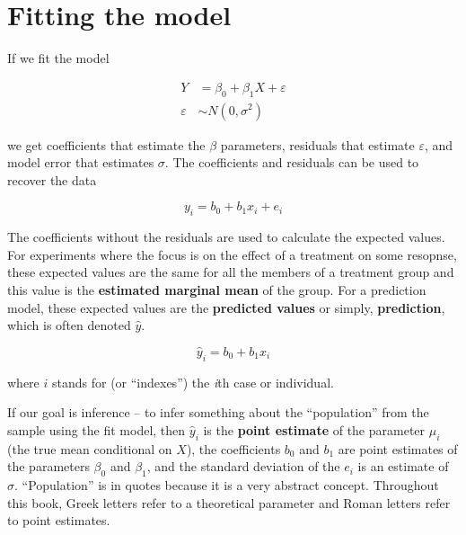 \documentclass[]{book}
\begin{document}
\hypertarget{fitting-the-model}{%
\section{Fitting the model}\label{fitting-the-model}}

If we fit the model

\begin{align}
Y &= \beta_0 + \beta_1 X + \varepsilon\\
\varepsilon &\sim N(0, \sigma^2)
\end{align}

we get coefficients that estimate the \(\beta\) parameters, residuals that estimate \(\varepsilon\), and model error that estimates \(\sigma\). The coefficients and residuals can be used to recover the data

\begin{equation}
y_i = b_0 + b_1 x_i + e_i
\end{equation}

The coefficients without the residuals are used to calculate the expected values. For experiments where the focus is on the effect of a treatment on some resopnse, these expected values are the same for all the members of a treatment group and this value is the \textbf{estimated marginal mean} of the group. For a prediction model, these expected values are the \textbf{predicted values} or simply, \textbf{prediction}, which is often denoted \(\hat{y}\).

\begin{equation}
\hat{y}_i = b_0 + b_1 x_i
\end{equation}

where \(i\) stands for (or ``indexes'') the \emph{i}th case or individual.

If our goal is inference -- to infer something about the ``population'' from the sample using the fit model, then \(\hat{y}_i\) is the \textbf{point estimate} of the parameter \(\mu_i\) (the true mean conditional on \(X\)), the coefficients \(b_0\) and \(b_1\) are point estimates of the parameters \(\beta_0\) and \(\beta_1\), and the standard deviation of the \(e_i\) is an estimate of \(\sigma\). ``Population'' is in quotes because it is a very abstract concept. Throughout this book, Greek letters refer to a theoretical parameter and Roman letters refer to point estimates.
\end{document}
